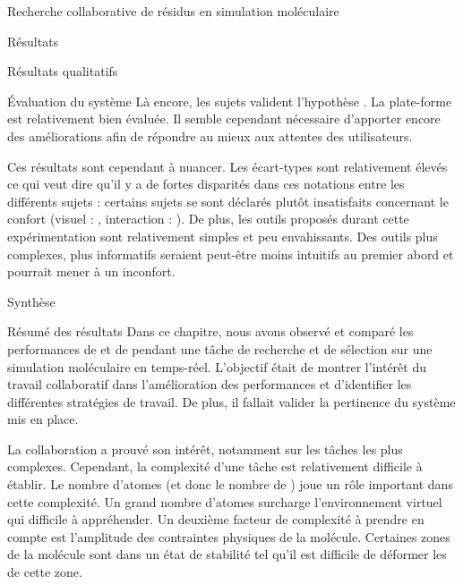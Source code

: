 \documentclass[myfrancais]{mythesis}
\begin{document}
\begin{mychapter}{Recherche collaborative de résidus en simulation moléculaire}
\begin{mysection}{Résultats}
\begin{mysubsection}{Résultats qualitatifs}
\begin{mysubsubsection}{Évaluation du système}
					Là encore, les sujets valident l'hypothèse .
					La plate-forme est relativement bien évaluée.
					Il semble cependant nécessaire d'apporter encore des améliorations afin de répondre au mieux aux attentes des utilisateurs.

					Ces résultats sont cependant à nuancer.
					Les écart-types sont relativement élevés ce qui veut dire qu'il y a de fortes disparités dans ces notations entre les différents sujets : certains sujets se sont déclarés plutôt insatisfaits concernant le confort (visuel : \mynum{2}, interaction : ).
					De plus, les outils proposés durant cette expérimentation sont relativement simples et peu envahissants.
					Des outils plus complexes, plus informatifs seraient peut-être moins intuitifs au premier abord et pourrait mener à un inconfort.
				\end{mysubsubsection}
			\end{mysubsection}
		\end{mysection}
		\begin{mysection}{Synthèse}
			\begin{mysubsection}{Résumé des résultats}
				Dans ce chapitre, nous avons observé et comparé les performances de  et de  pendant une tâche de recherche et de sélection sur une simulation moléculaire en temps-réel.
				L'objectif était de montrer l'intérêt du travail collaboratif dans l'amélioration des performances et d'identifier les différentes stratégies de travail.
				De plus, il fallait valider la pertinence du système mis en place.

				La collaboration a prouvé son intérêt, notamment sur les tâches les plus complexes.
				Cependant, la complexité d'une tâche est relativement difficile à établir.
				Le nombre d'atomes (et donc le nombre de ) joue un rôle important dans cette complexité.
				Un grand nombre d'atomes surcharge l'environnement virtuel qui difficile à appréhender.
				Un deuxième facteur de complexité à prendre en compte est l'amplitude des contraintes physiques de la molécule.
				Certaines zones de la molécule sont dans un état de stabilité tel qu'il est difficile de déformer les  de cette zone.


\end{mysubsection}
\end{mysection}
\end{mychapter}
\end{document}
